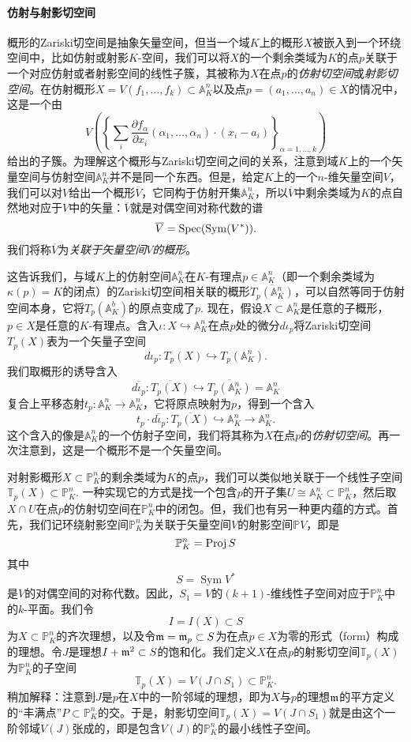 \paragraph*{仿射与射影切空间}
概形的Zariski切空间是抽象矢量空间，但当一个域$K$上的概形$X$被嵌入到一个环绕空间中，比如仿射或射影$K$-空间，我们可以将$X$的一个剩余类域为$K$的点$p$关联于一个对应仿射或者射影空间的线性子簇，其被称为$X$在点$p$的\textit{仿射切空间}或\textit{射影切空间}。在仿射概形$X=V(f_1,\dots,f_k)\subset \mathbb A_K^n$以及点$p=(a_1,\dots,a_n)\in X$的情况中，这是一个由
\[
	V\left(\left\{
		\sum_i \frac{\partial f_\alpha}{\partial x_i}(\alpha_1,\dots,\alpha_n)\cdot (x_i-a_i)
	\right\}_{\alpha=1,\dots,k}
	\right)
\]
给出的子簇。为理解这个概形与Zariski切空间之间的关系，注意到域$K$上的一个矢量空间与仿射空间$\mathbb A_K^n$并不是同一个东西。但是，给定$K$上的一个$n$-维矢量空间$V$，我们可以对$V$给出一个概形$\overline{V}$，它同构于仿射开集$\mathbb A_K^n$，所以$\overline{V}$中剩余类域为$K$的点自然地对应于$V$中的矢量：$\overline{V}$就是对偶空间对称代数的谱
\[
	\overline{V}=\operatorname{Spec} (\operatorname{Sym}(V^*)).
\]
我们将称$\overline{V}$为\textit{关联于矢量空间$V$的概形}。

这告诉我们，与域$K$上的仿射空间$\mathbb A_K^n$在$K$-有理点$p\in \mathbb A^n_K$（即一个剩余类域为$\kappa(p)=K$的闭点）的Zariski切空间相关联的概形$\overline{T_p(\mathbb A^n_K)}$，可以自然等同于仿射空间本身，它将$T_p(\mathbb A_K^b)$的原点变成了$p$. 现在，假设$X\subset \mathbb A_K^n$是任意的子概形，$p\in X$是任意的$K$-有理点。含入$\iota:X\hookrightarrow \mathbb A_K^n$在点$p$处的微分$d\iota_p$将Zariski切空间$T_p(X)$表为一个矢量子空间
\[
	d\iota_p:T_p(X)\hookrightarrow T_p(\mathbb A_K^n).
\]
我们取概形的诱导含入
\[
	\overline{d\iota_p}:\overline{T_p(X)}\hookrightarrow
	\overline{T_p(\mathbb A_K^n)}=\mathbb A_K^n
\]
复合上平移态射$t_p:\mathbb A^n_K\to \mathbb A^n_K$，它将原点映射为$p$，得到一个含入
\[
	t_p\cdot \overline{d\iota_p}:\overline{T_p(X)}\hookrightarrow
	\mathbb A_K^n \longrightarrow \mathbb A_K^n.
\]
这个含入的像是$\mathbb A_K^n$的一个仿射子空间，我们将其称为$X$在点$p$的\textit{仿射切空间}。再一次注意到，这是一个概形不是一个矢量空间。

对射影概形$X\subset \mathbb P_K^n$的剩余类域为$K$的点$p$，我们可以类似地关联于一个线性子空间$\mathbb T_p(X)\subset \mathbb P_K^n$. 一种实现它的方式是找一个包含$p$的开子集$U\cong \mathbb A_K^n\subset \mathbb P^n_K$，然后取$X\cap U$在点$p$的仿射切空间在$\mathbb P_K^n$中的闭包。但，我们也有另一种更内蕴的方式。首先，我们记环绕射影空间$\mathbb P_K^n$为关联于矢量空间$V$的射影空间$\mathbb PV$，即是
\[
	\mathbb P_K^n=\operatorname{Proj} S
\]
其中
\[
	S=\operatorname{Sym}V^*
\]
是$V$的对偶空间的对称代数。因此，$S_1=V$的$(k+1)$-维线性子空间对应于$\mathbb P_K^n$中的$k$-平面。我们令
\[
	I=I(X)\subset S
\]
为$X\subset \mathbb P_K^n$的齐次理想，以及令$\mathfrak{m}=\mathfrak{m}_p\subset S$为在点$p\in X$为零的形式（form）构成的理想。令$J$是理想$I+\mathfrak{m}^2\subset S$的饱和化。我们定义$X$在点$p$的射影切空间$\mathbb T_p(X)$为$\mathbb P_K^n$的子空间
\[
	\mathbb T_p (X)=V(J\cap S_1)\subset \mathbb P^n_K.
\]
稍加解释：注意到$J$是$p$在$X$中的一阶邻域的理想，即为$X$与$p$的理想$\mathfrak{m}$的平方定义的“丰满点”$P\subset \mathbb P_K^n$的交。于是，射影切空间$\mathbb T_p(X)=V(J\cap S_1)$就是由这个一阶邻域$V(J)$张成的，即是包含$V(J)$的$\mathbb P_K^n$的最小线性子空间。

